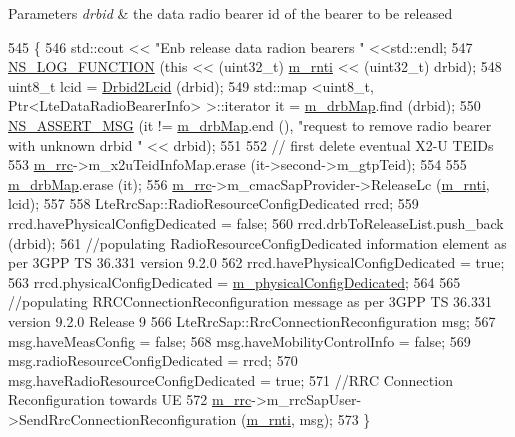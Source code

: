 \begin{DoxyParams}{Parameters}
{\em drbid} & the data radio bearer id of the bearer to be released \\
\hline
\end{DoxyParams}

\begin{DoxyCode}
545 \{
546 std::cout << \textcolor{stringliteral}{"Enb release data radion bearers  "} <<std::endl;
547         \hyperlink{log-macros-disabled_8h_a90b90d5bad1f39cb1b64923ea94c0761}{NS\_LOG\_FUNCTION} (\textcolor{keyword}{this} << (uint32\_t) \hyperlink{classns3_1_1UeManager_a5a72b4fe818f21993bd7f05d7e2c4f83}{m\_rnti} << (uint32\_t) drbid);
548   uint8\_t lcid = \hyperlink{classns3_1_1UeManager_af0ba90c3b4fe3300796ffc03de328f73}{Drbid2Lcid} (drbid);
549   std::map <uint8\_t, Ptr<LteDataRadioBearerInfo> >::iterator it = \hyperlink{classns3_1_1UeManager_a18499c025730b63c73e5d93effff57aa}{m\_drbMap}.find (drbid);
550   \hyperlink{assert_8h_aff5ece9066c74e681e74999856f08539}{NS\_ASSERT\_MSG} (it != \hyperlink{classns3_1_1UeManager_a18499c025730b63c73e5d93effff57aa}{m\_drbMap}.end (), \textcolor{stringliteral}{"request to remove radio bearer with unknown
       drbid "} << drbid);
551 
552   \textcolor{comment}{// first delete eventual X2-U TEIDs}
553   \hyperlink{classns3_1_1UeManager_ab4405e9f354c66e7c1a4c95832290f5b}{m\_rrc}->m\_x2uTeidInfoMap.erase (it->second->m\_gtpTeid);
554 
555   \hyperlink{classns3_1_1UeManager_a18499c025730b63c73e5d93effff57aa}{m\_drbMap}.erase (it);
556   \hyperlink{classns3_1_1UeManager_ab4405e9f354c66e7c1a4c95832290f5b}{m\_rrc}->m\_cmacSapProvider->ReleaseLc (\hyperlink{classns3_1_1UeManager_a5a72b4fe818f21993bd7f05d7e2c4f83}{m\_rnti}, lcid);
557 
558   LteRrcSap::RadioResourceConfigDedicated rrcd;
559   rrcd.havePhysicalConfigDedicated = \textcolor{keyword}{false};
560   rrcd.drbToReleaseList.push\_back (drbid);
561   \textcolor{comment}{//populating RadioResourceConfigDedicated information element as per 3GPP TS 36.331 version 9.2.0}
562   rrcd.havePhysicalConfigDedicated = \textcolor{keyword}{true};
563   rrcd.physicalConfigDedicated = \hyperlink{classns3_1_1UeManager_a5fca85495adcd0de6823e738094aacaf}{m\_physicalConfigDedicated};
564  
565   \textcolor{comment}{//populating RRCConnectionReconfiguration message as per 3GPP TS 36.331 version 9.2.0 Release 9}
566   LteRrcSap::RrcConnectionReconfiguration msg;
567   msg.haveMeasConfig = \textcolor{keyword}{false};
568   msg.haveMobilityControlInfo = \textcolor{keyword}{false};
569   msg.radioResourceConfigDedicated = rrcd;
570   msg.haveRadioResourceConfigDedicated = \textcolor{keyword}{true};
571   \textcolor{comment}{//RRC Connection Reconfiguration towards UE}
572   \hyperlink{classns3_1_1UeManager_ab4405e9f354c66e7c1a4c95832290f5b}{m\_rrc}->m\_rrcSapUser->SendRrcConnectionReconfiguration (\hyperlink{classns3_1_1UeManager_a5a72b4fe818f21993bd7f05d7e2c4f83}{m\_rnti}, msg);
573 \}
\end{DoxyCode}


